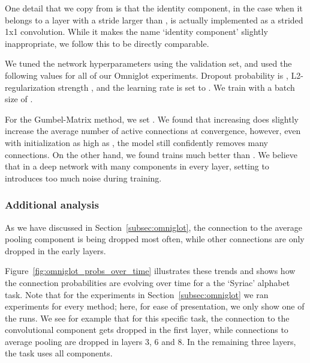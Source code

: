 \documentclass[conference]{IEEEtran}
\begin{document}
One detail that we copy from \cite{Diversity&Depth-ICLR-2019} is that the identity component, in the case when it belongs to a  layer with a stride larger than , is actually implemented as a strided 1x1 convolution. While it makes the name `identity component' slightly inappropriate, we follow this to be directly comparable.

We tuned the network hyperparameters using the validation set, and used the following values for all of our Omniglot experiments. Dropout probability is , L2-regularization strength , and the learning rate is set to . We train with a batch size of .

For the Gumbel-Matrix method, we set . We found that increasing  does slightly increase the average number of active connections at convergence, however, even with initialization as high as , the model still confidently removes many connections. On the other hand, we found  trains much better than . We believe that in a deep network with many components in every layer, setting  to  introduces too much noise during training.

\subsubsection{Additional analysis}\label{sec:prob_over_time_vis}

As we have discussed in Section~\ref{subsec:omniglot}, the connection to the average pooling component is being dropped most often, while other connections are only dropped in the early layers.

Figure~\ref{fig:omniglot_probs_over_time} illustrates these trends and shows how the connection probabilities are evolving over time for a the `Syriac' alphabet task. Note that for the experiments in Section~\ref{subsec:omniglot} we ran  experiments for every method; here, for ease of presentation, we only show one of the runs. We see for example that for this specific task, the connection to the  convolutional component gets dropped in the first layer, while connections to average pooling are dropped in layers 3, 6 and 8. In the remaining three layers, the task uses all components.
\end{document}
